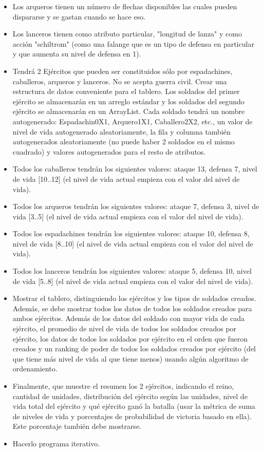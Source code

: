 \documentclass{article}
\begin{document}
\begin{itemize}
        \item Los arqueros tienen un número de flechas disponibles las cuales pueden dispararse y se gastan cuando se hace eso.
        \item Los lanceros tienen como atributo particular, "longitud de lanza" y como acción "schiltrom" (como una falange que es un tipo de defensa en particular y que aumenta su nivel de defensa en 1).
        \item Tendrá 2 Ejércitos que pueden ser constituidos sólo por espadachines, caballeros, arqueros y lanceros. No se acepta guerra civil. Crear una estructura de datos conveniente para el tablero. Los soldados del primer ejército se almacenarán en un arreglo estándar y los soldados del segundo ejército se almacenarán en un ArrayList. Cada soldado tendrá un nombre autogenerado: Espadachin0X1, Arquero1X1, Caballero2X2, etc., un valor de nivel de vida autogenerado aleatoriamente, la fila y columna también autogenerados aleatoriamente (no puede haber 2 soldados en el mismo cuadrado) y valores autogenerados para el resto de atributos.
        \item Todos los caballeros tendrán los siguientes valores: ataque 13, defensa 7, nivel de vida [10..12] (el nivel de vida actual empieza con el valor del nivel de vida).
        \item Todos los arqueros tendrán los siguientes valores: ataque 7, defensa 3, nivel de vida [3..5] (el nivel de vida actual empieza con el valor del nivel de vida).
        \item Todos los espadachines tendrán los siguientes valores: ataque 10, defensa 8, nivel de vida [8..10] (el nivel de vida actual empieza con el valor del nivel de vida).
        \item Todos los lanceros tendrán los siguientes valores: ataque 5, defensa 10, nivel de vida [5..8] (el nivel de vida actual empieza con el valor del nivel de vida).
        \item Mostrar el tablero, distinguiendo los ejércitos y los tipos de soldados creados. Además, se debe mostrar todos los datos de todos los soldados creados para ambos ejércitos. Además de los datos del soldado con mayor vida de cada ejército, el promedio de nivel de vida de todos los soldados creados por ejército, los datos de todos los soldados por ejército en el orden que fueron creados y un ranking de poder de todos los soldados creados por ejército (del que tiene más nivel de vida al que tiene menos) usando algún algoritmo de ordenamiento.
        \item Finalmente, que muestre el resumen los 2 ejércitos, indicando el reino, cantidad de unidades, distribución del ejército según las unidades, nivel de vida total del ejército y qué ejército ganó la batalla (usar la métrica de suma de niveles de vida y porcentajes de probabilidad de victoria basado en ella). Este porcentaje también debe mostrarse.
        \item Hacerlo programa iterativo.
	\end{itemize}
		
\end{document}
